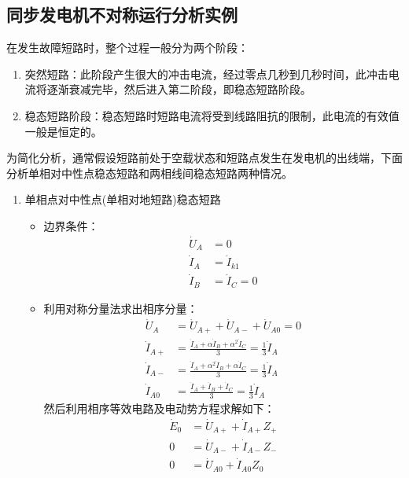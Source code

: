 \documentclass[blue]{elegantnote}
\begin{document}
\subsection{同步发电机不对称运行分析实例}
\indent 在发生故障短路时，整个过程一般分为两个阶段：
\begin{enumerate}
	\item 突然短路：此阶段产生很大的冲击电流，经过零点几秒到几秒时间，此冲击电流将逐渐衰减完毕，然后进入第二阶段，即稳态短路阶段。
	\item 稳态短路阶段：稳态短路时短路电流将受到线路阻抗的限制，此电流的有效值一般是恒定的。
\end{enumerate}
为简化分析，通常假设短路前处于空载状态和短路点发生在发电机的出线端，下面分析单相对中性点稳态短路和两相线间稳态短路两种情况。
\begin{enumerate}
	\item 单相点对中性点(单相对地短路)稳态短路
	\begin{itemize}
		\item 边界条件：
		\begin{displaymath}
		\begin{aligned}
			\dot{U}_A&=0\\
			\dot{I}_A&=\dot{I}_{k1}\\
			\dot{I}_B&=\dot{I}_C=0
		\end{aligned}
		\end{displaymath}
		\item 利用对称分量法求出相序分量：
		\begin{displaymath}
		\begin{aligned}
			\dot{U}_A&=\dot{U}_{A+}+\dot{U}_{A-}+\dot{U}_{A0}=0\\
			\dot{I}_{A+}&=\frac{\dot{I}_{A}+\alpha \dot{I}_{B}+\alpha^{2}\dot{I}_{C}}{3}=\frac{1}{3}\dot{I}_{A}\\
			\dot{I}_{A-}&=\frac{\dot{I}_{A}+\alpha^{2} \dot{I}_{B}+\alpha\dot{I}_{C}}{3}=\frac{1}{3}\dot{I}_{A}\\
			\dot{I}_{A0}&=\frac{\dot{I}_{A}+ \dot{I}_{B}+\dot{I}_{C}}{3}=\frac{1}{3}\dot{I}_{A}
		\end{aligned}
		\end{displaymath}
		然后利用相序等效电路及电动势方程求解如下：
		\begin{displaymath}
		\begin{aligned}
			\dot{E}_0&=\dot{U}_{A+}+\dot{I}_{A+}Z_{+}\\
			0&=\dot{U}_{A-}+\dot{I}_{A-}Z_{-}\\	
			0&=\dot{U}_{A0}+\dot{I}_{A0}Z_{0}\\	

\end{aligned}
\end{displaymath}
\end{itemize}
\end{enumerate}
\end{document}
